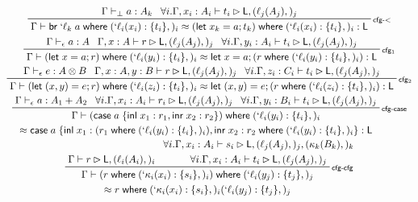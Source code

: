 \documentclass[acmsmall,screen,review]{acmart}
\newcommand{\ms}[1]{\ensuremath{\mathsf{#1}}}
\newcommand{\lbl}[1]{{`#1}}
\newcommand{\lto}{:}
\newcommand{\linl}[1]{\ms{inl}\;{#1}}
\newcommand{\linr}[1]{\ms{inr}\;{#1}}
\newcommand{\letstmt}[3]{\ensuremath{\ms{let}\;#1 = #2; #3}}
\newcommand{\brb}[2]{\ms{br}\;#1\;#2}
\newcommand{\lbrb}[2]{\brb{\lbl{#1}}{#2}}
\newcommand{\casestmt}[5]{\ms{case}\;#1\;\{\linl{#2} \lto #3, \linr{#4} \lto #5\}}
\newcommand{\where}[2]{#1\;\ms{where}\;#2}
\newcommand{\wbranch}[3]{#1(#2) \lto \{#3\}}
\newcommand{\lwbranch}[3]{\wbranch{\lbl{#1}}{#2}{#3}}
\newcommand{\bhyp}[2]{#1 : #2}
\newcommand{\lhyp}[2]{#1(#2)}
\newcommand{\rle}[1]{{\scriptsize\textsf{#1}}}
\newcommand{\hasty}[4]{#1 \vdash_{#2} #3: {#4}}
\newcommand{\haslb}[3]{#1 \vdash #2 \rhd #3}
\newcommand{\teqv}{\approx}
\newcommand{\lbeq}[4]{#1 \vdash #2 \teqv #3 : {#4}}
\begin{document}
\begin{gather*}
    \prftree[r]{\rle{cfg-$<$}}
      {\hasty{\Gamma}{\bot}{a}{A_k}}
      {\forall i. \haslb{\Gamma, \bhyp{x_i}{A_i}}{t_i}{\ms{L}, (\lhyp{\ell_j}{A_j},)_j}}
      {\lbeq{\Gamma}
        {\where{\lbrb{\ell_k}{a}}{(\lwbranch{\ell_i}{x_i}{t_i},)_i}}
        {\where{(\letstmt{x_k}{a}{t_k})}{(\lwbranch{\ell_i}{x_i}{t_i},)_i}}
        {\ms{L}}}
    \\
    \prftree[r]{\rle{cfg$_1$}}
      {\hasty{\Gamma}{\epsilon}{a}{A}}
      {\haslb{\Gamma, \bhyp{x}{A}}{r}{\ms{L}, (\lhyp{\ell_j}{A_j},)_j}}
      {\forall i. \haslb{\Gamma, \bhyp{y_i}{A_i}}{t_i}{\ms{L}, (\lhyp{\ell_j}{A_j},)_j}}
      {\lbeq{\Gamma}
        {\where{(\letstmt{x}{a}{r})}{(\lwbranch{\ell_i}{y_i}{t_i},)_i}}
        {\letstmt{x}{a}{(\where{r}{(\lwbranch{\ell_i}{y_i}{t_i},)_i})}}
        {\ms{L}}}
    \\
    \prftree[r]{\rle{cfg$_2$}}
      {\hasty{\Gamma}{\epsilon}{e}{A \otimes B}}
      {\haslb{\Gamma, \bhyp{x}{A}, \bhyp{y}{B}}{r}{\ms{L}, (\lhyp{\ell_j}{A_j},)_j}}
      {\forall i. \haslb{\Gamma, \bhyp{z_i}{C_i}}{t_i}{\ms{L}, (\lhyp{\ell_j}{A_j},)_j}}
      {\lbeq{\Gamma}
        {\where{(\letstmt{(x, y)}{e}{r})}{(\lwbranch{\ell_i}{z_i}{t_i},)_i}}
        {\letstmt{(x, y)}{e}{(\where{r}{(\lwbranch{\ell_i}{z_i}{t_i},)_i})}}
        {\ms{L}}}
    \\
    \prftree[r]{\rle{cfg-case}}
      {\hasty{\Gamma}{\epsilon}{a}{A_1 + A_2}}
      {\forall i. \haslb{\Gamma, \bhyp{x_i}{A_i}}{r_i}{\ms{L}, (\lhyp{\ell_j}{A_j},)_j}}
      {\forall i. \haslb{\Gamma, \bhyp{y_i}{B_i}}{t_i}{\ms{L}, (\lhyp{\ell_j}{A_j},)_j}}
      {
        \prfStackPremises
        {\Gamma \vdash \where{(\casestmt{a}{x_1}{r_1}{x_2}{r_2})}
          {(\lwbranch{\ell_i}{y_i}{t_i},)_i} }
        {\approx \casestmt{a}
          {x_1}{(\where{r_1}{(\lwbranch{\ell_i}{y_i}{t_i},)_i})}
          {x_2}{\where{r_2}{(\lwbranch{\ell_i}{y_i}{t_i},)_i}} : \ms{L}}
      }
    \\
    \prftree[r]{\rle{cfg-cfg}}
      {\haslb{\Gamma}{r}{\ms{L}, (\lhyp{\ell_i}{A_i},)_i}}
      {
        \prfStackPremises
        {\forall i. \haslb{\Gamma, \bhyp{x_i}{A_i}}
          {s_i}{\ms{L}, (\lhyp{\ell_j}{A_j},)_j, (\lhyp{\kappa_k}{B_k},)_k}}
        {\forall i. \haslb{\Gamma, \bhyp{x_i}{A_i}}{t_i}{\ms{L}, (\lhyp{\ell_j}{A_j},)_j}} 
      }
      {
        \prfStackPremises
        {\Gamma \vdash \where{(\where{r}{(\lwbranch{\kappa_i}{x_i}{s_i},)_i})}
          {(\lwbranch{\ell_i}{y_j}{t_j},)_j}}
        {\approx \where{r}{(\lwbranch{\kappa_i}{x_i}{s_i},)_i(\lwbranch{\ell_i}{y_j}{t_j},)_j} 
}}
\end{gather*}
\end{document}
